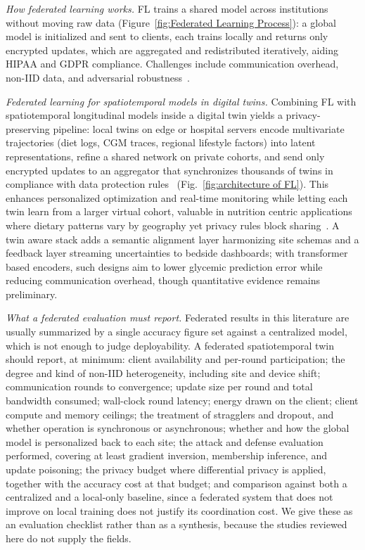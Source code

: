 \documentclass[journal]{IEEEtran}
\newif\ifsubmission
\begin{document}
\emph{How federated learning works.} FL trains a shared model across institutions without moving raw data\ifsubmission\else{} (Figure~\ref{fig:Federated Learning Process})\fi : a global model is initialized and sent to clients, each trains locally and returns only encrypted updates, which are aggregated and redistributed iteratively, aiding HIPAA and GDPR compliance. Challenges include communication overhead, non-IID data, and adversarial robustness~\cite{prayitno2021FLhealthcare,coelho2023FLsecurity}.


\emph{Federated learning for spatiotemporal models in digital twins.} Combining FL with spatiotemporal longitudinal models inside a digital twin yields a privacy-preserving pipeline: local twins on edge or hospital servers encode multivariate trajectories (diet logs, CGM traces, regional lifestyle factors) into latent representations, refine a shared network on private cohorts, and send only encrypted updates to an aggregator that synchronizes thousands of twins in compliance with data protection rules~\cite{aouedi2022FLmedical}\ifsubmission\else{} (Fig.~\ref{fig:architecture of FL})\fi . This enhances personalized optimization and real-time monitoring while letting each twin learn from a larger virtual cohort, valuable in nutrition centric applications where dietary patterns vary by geography yet privacy rules block sharing~\cite{nguyen2022FLsmarthealthcare}. A twin aware stack adds a semantic alignment layer harmonizing site schemas and a feedback layer streaming uncertainties to bedside dashboards; with transformer based encoders, such designs aim to lower glycemic prediction error while reducing communication overhead, though quantitative evidence remains preliminary.

\emph{What a federated evaluation must report.} Federated results in this literature are usually summarized by a single accuracy figure set against a centralized model, which is not enough to judge deployability. A federated spatiotemporal twin should report, at minimum: client availability and per-round participation; the degree and kind of non-IID heterogeneity, including site and device shift; communication rounds to convergence; update size per round and total bandwidth consumed; wall-clock round latency; energy drawn on the client; client compute and memory ceilings; the treatment of stragglers and dropout, and whether operation is synchronous or asynchronous; whether and how the global model is personalized back to each site; the attack and defense evaluation performed, covering at least gradient inversion, membership inference, and update poisoning; the privacy budget where differential privacy is applied, together with the accuracy cost at that budget; and comparison against both a centralized and a local-only baseline, since a federated system that does not improve on local training does not justify its coordination cost. We give these as an evaluation checklist rather than as a synthesis, because the studies reviewed here do not supply the fields.
\end{document}
